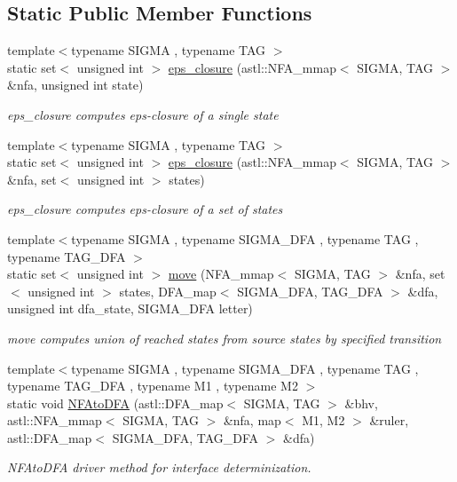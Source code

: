 \subsection*{Static Public Member Functions}
\begin{DoxyCompactItemize}
\item 
{\footnotesize template$<$typename S\+I\+G\+MA , typename T\+AG $>$ }\\static set$<$ unsigned int $>$ \hyperlink{class_determinization_a22c8f2c6e117c7b25c5375b6f395317b}{eps\+\_\+closure} (astl\+::\+N\+F\+A\+\_\+mmap$<$ S\+I\+G\+MA, T\+AG $>$ \&nfa, unsigned int state)
\begin{DoxyCompactList}\small\item\em eps\+\_\+closure computes eps-\/closure of a single state \end{DoxyCompactList}\item 
{\footnotesize template$<$typename S\+I\+G\+MA , typename T\+AG $>$ }\\static set$<$ unsigned int $>$ \hyperlink{class_determinization_aaf37598efd880e04fb0bba9e01351dab}{eps\+\_\+closure} (astl\+::\+N\+F\+A\+\_\+mmap$<$ S\+I\+G\+MA, T\+AG $>$ \&nfa, set$<$ unsigned int $>$ states)
\begin{DoxyCompactList}\small\item\em eps\+\_\+closure computes eps-\/closure of a set of states \end{DoxyCompactList}\item 
{\footnotesize template$<$typename S\+I\+G\+MA , typename S\+I\+G\+M\+A\+\_\+\+D\+FA , typename T\+AG , typename T\+A\+G\+\_\+\+D\+FA $>$ }\\static set$<$ unsigned int $>$ \hyperlink{class_determinization_aa05556441aefb6ee604167e7e9bd5c69}{move} (N\+F\+A\+\_\+mmap$<$ S\+I\+G\+MA, T\+AG $>$ \&nfa, set$<$ unsigned int $>$ states, D\+F\+A\+\_\+map$<$ S\+I\+G\+M\+A\+\_\+\+D\+FA, T\+A\+G\+\_\+\+D\+FA $>$ \&dfa, unsigned int dfa\+\_\+state, S\+I\+G\+M\+A\+\_\+\+D\+FA letter)
\begin{DoxyCompactList}\small\item\em move computes union of reached states from source states by specified transition \end{DoxyCompactList}\item 
{\footnotesize template$<$typename S\+I\+G\+MA , typename S\+I\+G\+M\+A\+\_\+\+D\+FA , typename T\+AG , typename T\+A\+G\+\_\+\+D\+FA , typename M1 , typename M2 $>$ }\\static void \hyperlink{class_determinization_a06ec7854454e92290ebb1b140b0f9b38}{N\+F\+Ato\+D\+FA} (astl\+::\+D\+F\+A\+\_\+map$<$ S\+I\+G\+MA, T\+AG $>$ \&bhv, astl\+::\+N\+F\+A\+\_\+mmap$<$ S\+I\+G\+MA, T\+AG $>$ \&nfa, map$<$ M1, M2 $>$ \&ruler, astl\+::\+D\+F\+A\+\_\+map$<$ S\+I\+G\+M\+A\+\_\+\+D\+FA, T\+A\+G\+\_\+\+D\+FA $>$ \&dfa)
\begin{DoxyCompactList}\small\item\em N\+F\+Ato\+D\+FA driver method for interface determinization. \end{DoxyCompactList}\end{DoxyCompactItemize}


